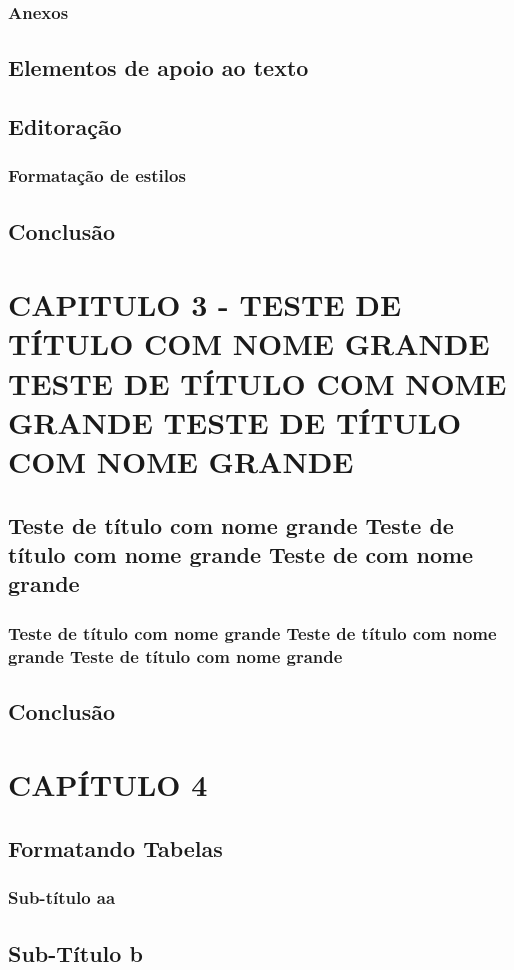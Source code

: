 \documentclass[pnumromarab, normaltoc, a4paper, 12pt]{abnt-unochapeco}
\begin{document}
\subsection{Anexos}
\section{Elementos de apoio ao texto}
\section{Editoração}
\subsection{Formatação de estilos}
\section{Conclusão}
\chapter{CAPITULO 3 - TESTE DE TÍTULO COM NOME GRANDE TESTE DE TÍTULO COM NOME
GRANDE TESTE DE TÍTULO COM NOME GRANDE}
\section{Teste de título com nome grande Teste de título com nome grande Teste
de com nome grande}
\subsection{Teste de título com nome grande Teste de título com nome grande
Teste de título com nome grande}
\section{Conclusão}
\chapter{CAPÍTULO 4}
\section{Formatando Tabelas}
\subsection{Sub-título aa}
\section{Sub-Título b}
\end{document}
